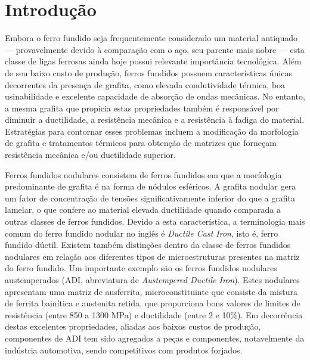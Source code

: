 \chapter{Introdução}

Embora o ferro fundido seja frequentemente considerado um material antiquado --- provavelmente devido à comparação com o aço, seu parente mais nobre --- esta classe de ligas ferrosas ainda hoje possui relevante importância tecnológica. Além de seu baixo custo de produção, ferros fundidos possuem características únicas decorrentes da presença de grafita, como elevada condutividade térmica, boa usinabilidade e excelente capacidade de absorção de ondas mecânicas. No entanto, a mesma grafita que propicia estas propriedades também é responsável por diminuir a ductilidade, a resistência mecânica e a resistência à fadiga do material. Estratégias para contornar esses problemas incluem a modificação da morfologia de grafita e tratamentos térmicos para obtenção de matrizes que forneçam resistência mecânica e/ou ductilidade superior.

Ferros fundidos nodulares consistem de ferros fundidos em que a morfologia predominante de grafita é na forma de nódulos esféricos. A grafita nodular gera um fator de concentração de tensões significativamente inferior do que a grafita lamelar, o que confere ao material elevada ductilidade quando comparada a outras classes de ferros fundidos. Devido a esta característica, a terminologia mais comum do ferro fundido nodular no inglês é \textit{Ductile Cast Iron}, isto é, ferro fundido dúctil. Existem também distinções dentro da classe de ferros fundidos nodulares em relação aos diferentes tipos de microestruturas presentes na matriz do ferro fundido. Um importante exemplo são os ferros fundidos nodulares austemperados (ADI, abreviatura de \textit{Austempered Ductile Iron}). Estes nodulares apresentam uma matriz de ausferrita, microconstituinte que consiste da mistura de ferrita bainítica e austenita retida, que proporciona bons valores de limites de resistência (entre 850 a 1300 MPa) e ductilidade (entre 2 e 10\%)\cite{Guesser2009}. Em decorrência destas excelentes propriedades, aliadas aos baixos custos de produção, componentes de ADI tem sido agregados a peças e componentes, notavelmente da indústria automotiva, sendo competitivos com produtos forjados\cite{Hayrynen2002}.

